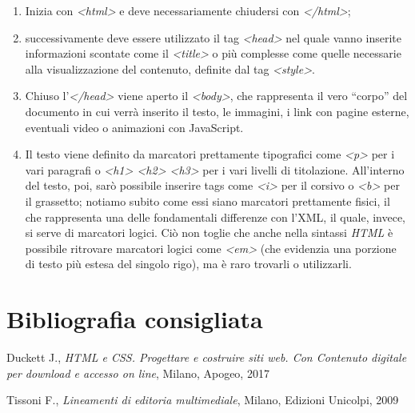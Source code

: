 \documentclass[
  b5paper,
  twoside,
  12pt,
  chapterprefix=false,
  bibliography=totocnumbered,
  parskip=false]{scrbook}
\begin{document}
\begin{enumerate}
\def\labelenumi{\arabic{enumi}.}
\item
  Inizia con \emph{\textless html\textgreater{}} e deve necessariamente chiudersi con
  \emph{\textless/html\textgreater{}};
\item
  successivamente deve essere utilizzato il tag \emph{\textless head\textgreater{}} nel quale
  vanno inserite informazioni scontate come il \emph{\textless title\textgreater{}} o più
  complesse come quelle necessarie alla visualizzazione del contenuto,
  definite dal tag \emph{\textless style\textgreater{}}.
\item
  Chiuso l'\emph{\textless/head\textgreater{}} viene aperto il \emph{\textless body\textgreater{}}, che rappresenta il
  vero \enquote{corpo} del documento in cui verrà inserito il testo, le
  immagini, i link con pagine esterne, eventuali video o animazioni
  con JavaScript.
\item
  Il testo viene definito da marcatori prettamente tipografici come
  \emph{\textless p\textgreater{}} per i vari paragrafi o \emph{\textless h1\textgreater{} \textless h2\textgreater{} \textless h3\textgreater{}} per i vari
  livelli di titolazione. All'interno del testo, poi, sarò possibile
  inserire tags come \emph{\textless i\textgreater{}} per il corsivo o \emph{\textless b\textgreater{}} per il
  grassetto; notiamo subito come essi siano marcatori prettamente
  fisici, il che rappresenta una delle fondamentali differenze con
  l'XML, il quale, invece, si serve di marcatori logici. Ciò non
  toglie che anche nella sintassi \emph{HTML} è possibile ritrovare
  marcatori logici come \emph{\textless em\textgreater{}} (che evidenzia una porzione di testo
  più estesa del singolo rigo), ma è raro trovarli o utilizzarli.
\end{enumerate}

\hypertarget{bibliografia-consigliata-12}{%
\section*{Bibliografia consigliata}\label{bibliografia-consigliata-12}}

Duckett J., \emph{HTML e CSS. Progettare e costruire siti web. Con Contenuto
digitale per download e accesso on line}, Milano, Apogeo, 2017

Tissoni F., \emph{Lineamenti di editoria multimediale}, Milano, Edizioni
Unicolpi, 2009
\end{document}

